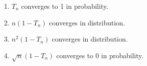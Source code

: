 \begin{enumerate}[label=\thesection.\arabic*.,ref=\thesection.\theenumi]
\begin{enumerate}
    \item $T_{n}$ converges to 1 in probability.
    \item $n(1-T_{n})$ converges in distribution.
    \item $n^{2}(1-T_{n})$ converges in distribution.
    \item $\sqrt{n}(1-T_{n})$ converges to 0 in probability.
\end{enumerate}
%
\solution


\end{enumerate}
